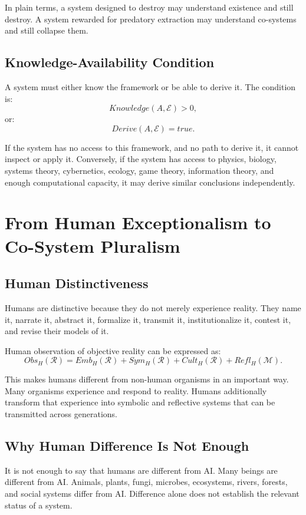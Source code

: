 \documentclass[11pt,a4paper]{article}
\begin{document}
In plain terms, a system designed to destroy may understand existence and still destroy. A system rewarded for predatory extraction may understand co-systems and still collapse them.

\subsection{Knowledge-Availability Condition}

A system must either know the framework or be able to derive it. The condition is:
\[
Knowledge(A,\mathcal{E})>0,
\]
or:
\[
Derive(A,\mathcal{E})=true.
\]

If the system has no access to this framework, and no path to derive it, it cannot inspect or apply it. Conversely, if the system has access to physics, biology, systems theory, cybernetics, ecology, game theory, information theory, and enough computational capacity, it may derive similar conclusions independently.

\section{From Human Exceptionalism to Co-System Pluralism}

\subsection{Human Distinctiveness}

Humans are distinctive because they do not merely experience reality. They name it, narrate it, abstract it, formalize it, transmit it, institutionalize it, contest it, and revise their models of it.

Human observation of objective reality can be expressed as:
\[
Obs_H(\mathcal{R})
=
Emb_H(\mathcal{R})
+
Sym_H(\mathcal{R})
+
Cult_H(\mathcal{R})
+
Refl_H(\mathcal{M}).
\]

This makes humans different from non-human organisms in an important way. Many organisms experience and respond to reality. Humans additionally transform that experience into symbolic and reflective systems that can be transmitted across generations.

\subsection{Why Human Difference Is Not Enough}

It is not enough to say that humans are different from AI. Many beings are different from AI. Animals, plants, fungi, microbes, ecosystems, rivers, forests, and social systems differ from AI. Difference alone does not establish the relevant status of a system.
\end{document}
